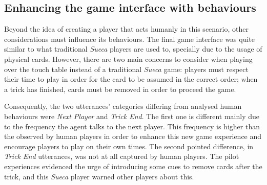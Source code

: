 \subsection{Enhancing the game interface with behaviours}

Beyond the idea of creating a player that acts humanly in this scenario, other considerations must influence its behaviours.
The final game interface was quite similar to what traditional \emph{Sueca} players are used to, specially due to the usage of physical cards.
However, there are two main concerns to consider when playing over the touch table instead of a traditional \emph{Sueca} game: players must respect their time to play in order for the card to be assumed in the correct order; when a trick has finished, cards must be removed in order to proceed the game.

Consequently, the two utterances' categories differing from analysed human behaviours were \emph{Next Player} and \emph{Trick End}.
The first one is different mainly due to the frequency the agent talks to the next player.
This frequency is higher than the observed by human players in order to enhance this new game experience and encourage players to play on their own times.
The second pointed difference, in \emph{Trick End} utterances, was not at all captured by human players.
The pilot experiences evidenced the urge of introducing some cues to remove cards after the trick, and this \emph{Sueca} player warned other players about this.
